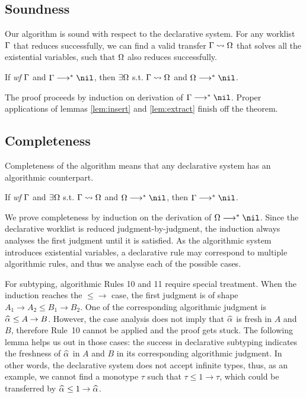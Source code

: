\subsection{Soundness}

Our algorithm is sound with respect to the declarative system.
For any worklist $\Gamma$ that reduces successfully,
we can find a valid transfer $\Gamma\rightsquigarrow\Omega$ that solves all the existential variables,
such that $\Omega$ also reduces successfully.
\begin{theorem}[Soundness]
If \emph{wf }$\Gamma$ and $\Gm \redto \nil$, then $\exists \Omega$ s.t. $\Gamma\rightsquigarrow\Omega$ and $\Om\redto\nil$.
\end{theorem}

The proof proceeds by induction on derivation of $\Gm\redto\nil$.
Proper applications of lemmas \ref{lem:insert} and \ref{lem:extract}
finish off the theorem.

\subsection{Completeness}

Completeness of the algorithm means that any declarative system has an algorithmic counterpart.

\begin{theorem}[Completeness]
If \emph{wf }$\Gamma$ and $\exists \Omega$ s.t. $\Gamma\rightsquigarrow\Omega$ and $\Om\redto\nil$, then $\Gm \redto \nil$.
\end{theorem}

We prove completeness by induction on the derivation of $\Om\redto\nil$.
Since the declarative worklist is reduced judgment-by-judgment,
the induction always analyses the first judgment until it is satisfied.
As the algorithmic system introduces existential variables,
a declarative rule may correspond to multiple algorithmic rules,
and thus we analyse each of the possible cases.

For subtyping, algorithmic Rules 10 and 11 require special treatment.
When the induction reaches the $\mathtt{{\le}{\to}}$ case,
the first judgment is of shape $A_1 \to A_2 \le B_1 \to B_2$.
One of the corresponding algorithmic judgment is $\al \le A \to B$.
However, the case analysis does not imply that $\al$ is fresh in $A$ and $B$,
therefore Rule~10 cannot be applied and the proof gets stuck.
The following lemma helps us out in those cases:
the success in declarative subtyping indicates the freshness of $\al$ in $A$ and $B$
in its corresponding algorithmic judgment.
In other words, the declarative system does not accept infinite types,
thus, as an example, we cannot find a monotype $\tau$ such that $\tau\le 1\to \tau$,
which could be transferred by $\al\le 1\to\al$.

